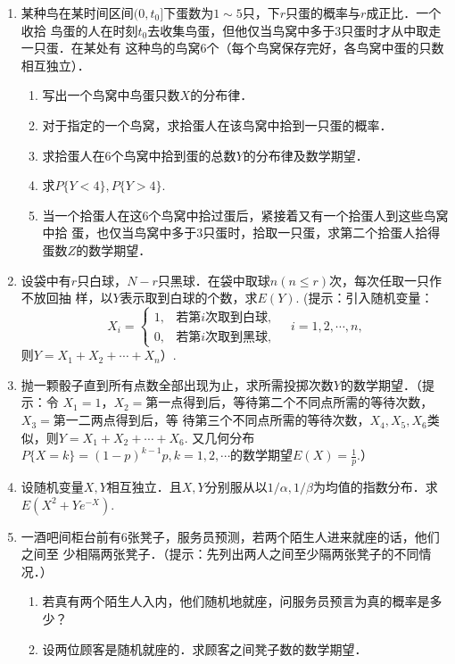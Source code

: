 \documentclass[10pt,a4paper]{article}
\begin{document}
\begin{enumerate}
    \item 某种鸟在某时间区间$(0,t_0]$下蛋数为$1\sim 5$只，下$r$只蛋的概率与$r$成正比．一个收拾
    鸟蛋的人在时刻$t_0$去收集鸟蛋，但他仅当鸟窝中多于3只蛋时才从中取走一只蛋．在某处有
    这种鸟的鸟窝6个（每个鸟窝保存完好，各鸟窝中蛋的只数相互独立）．
    \begin{enumerate}
        \item 写出一个鸟窝中鸟蛋只数$X$的分布律．
        \item 对于指定的一个鸟窝，求拾蛋人在该鸟窝中拾到一只蛋的概率．
        \item 求拾蛋人在6个鸟窝中拾到蛋的总数$Y$的分布律及数学期望．
        \item 求$P\{Y<4\},P\{Y>4\}$.
        \item 当一个拾蛋人在这6个鸟窝中拾过蛋后，紧接着又有一个拾蛋人到这些鸟窝中拾
        蛋，也仅当鸟窝中多于3只蛋时，拾取一只蛋，求第二个拾蛋人拾得蛋数$Z$的数学期望．
    \end{enumerate}



    \item 设袋中有$r$只白球，$N-r$只黑球．在袋中取球$n(n\leq r)$次，每次任取一只作不放回抽
    样，以$Y$表示取到白球的个数，求$E(Y)$. (提示：引入随机变量：
    $$X_i=\left\{\begin{array}{ll}
        1, & \mbox{若第}i\mbox{次取到白球},\\
        0, & \mbox{若第}i\mbox{次取到黑球},
    \end{array}\right.\quad
    i=1,2,\cdots,n,$$
    则$Y=X_1+X_2+\cdots+X_n$）.



    \item 抛一颗骰子直到所有点数全部出现为止，求所需投掷次数$Y$的数学期望．（提示：令
    $X_1=1$，$X_2=$第一点得到后，等待第二个不同点所需的等待次数， $X_3=$第一二两点得到后，等
    待第三个不同点所需的等待次数，$X_4,X_5,X_6$类似，则$Y=X_1+X_2+\cdots+X_6$. 又几何分布
    $P\{X=k\}=(1-p)^{k-1}p,k=1,2,\cdots$的数学期望$E(X)=\frac{1}{p}$.）



    \item 设随机变量$X,Y$相互独立．且$X,Y$分别服从以$1/\alpha,1/\beta$为均值的指数分布．求
    $E(X^2+Ye^{-X})$.





    \item 一酒吧间柜台前有6张凳子，服务员预测，若两个陌生人进来就座的话，他们之间至
    少相隔两张凳子．（提示：先列出两人之间至少隔两张凳子的不同情况．）
    \begin{enumerate}
        \item 若真有两个陌生人入内，他们随机地就座，问服务员预言为真的概率是多少？
        \item 设两位顾客是随机就座的．求顾客之间凳子数的数学期望．
    \end{enumerate}





\end{enumerate}
\end{document}
